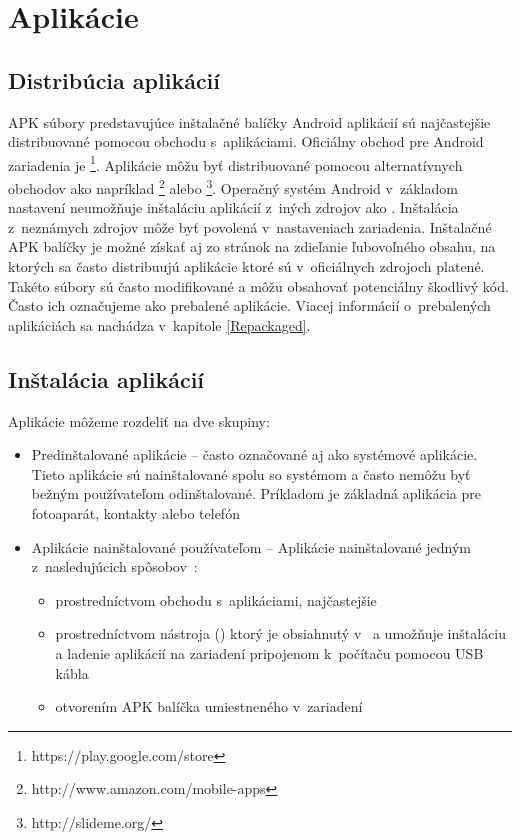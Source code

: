 \section{Aplikácie}
\subsection{Distribúcia aplikácií}

APK súbory predstavujúce inštalačné balíčky Android aplikácií sú najčastejšie distribuované pomocou obchodu s~aplikáciami. Oficiálny obchod pre Android zariadenia je \footnote{https://play.google.com/store}. Aplikácie môžu byť distribuované pomocou alternatívnych obchodov ako napríklad \footnote{http://www.amazon.com/mobile-apps} alebo \footnote{http://slideme.org/}. Operačný systém Android v~základom nastavení neumožňuje inštaláciu aplikácií z~iných zdrojov ako . Inštalácia z~neznámych zdrojov môže byť povolená v~nastaveniach zariadenia. Inštalačné APK balíčky je možné získať aj zo stránok na zdieľanie ľubovoľného obsahu, na ktorých sa často distribuujú aplikácie ktoré sú v~oficiálnych zdrojoch platené. Takéto súbory sú často modifikované a môžu obsahovať potenciálny škodlivý kód. Často ich označujeme ako prebalené aplikácie. Viacej informácií o~prebalených aplikáciách sa nachádza v~kapitole \ref{Repackaged}.

\subsection{Inštalácia aplikácií}
Aplikácie môžeme rozdeliť na dve skupiny:
\begin{itemize}
\item Predinštalované aplikácie – často označované aj ako systémové aplikácie. Tieto aplikácie sú nainštalované spolu so systémom a často nemôžu byť bežným používateľom odinštalované. Príkladom je základná aplikácia pre fotoaparát, kontakty alebo telefón
\item Aplikácie nainštalované používateľom – Aplikácie nainštalované jedným z~nasledujúcich spôsobov~\cite{Elenkov2015}:
\begin{itemize}
\item prostredníctvom obchodu s~aplikáciami, najčastejšie 
\item prostredníctvom nástroja  () ktorý je obsiahnutý v~ a umožňuje inštaláciu a ladenie aplikácií na zariadení pripojenom k~počítaču pomocou USB kábla
\item otvorením APK balíčka umiestneného v~zariadení
\end{itemize}
\end{itemize}

